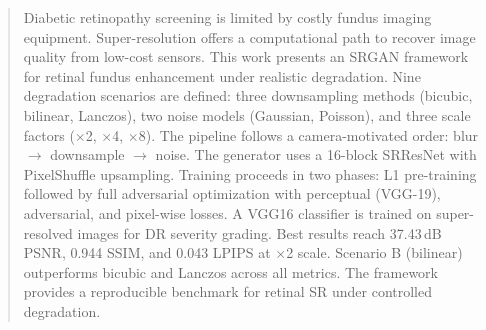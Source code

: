 \begin{abstract}

    Diabetic retinopathy screening is limited by costly fundus imaging equipment.
    Super-resolution offers a computational path to recover image quality from low-cost sensors.
    This work presents an SRGAN framework for retinal fundus enhancement under realistic degradation.
    Nine degradation scenarios are defined: three downsampling methods (bicubic, bilinear, Lanczos), two noise models (Gaussian, Poisson), and three scale factors ($\times$2, $\times$4, $\times$8).
    The pipeline follows a camera-motivated order: blur $\rightarrow$ downsample $\rightarrow$ noise.
    The generator uses a 16-block SRResNet with PixelShuffle upsampling.
    Training proceeds in two phases: L1 pre-training followed by full adversarial optimization with perceptual (VGG-19), adversarial, and pixel-wise losses.
    A VGG16 classifier is trained on super-resolved images for DR severity grading.
    Best results reach 37.43\,dB PSNR, 0.944 SSIM, and 0.043 LPIPS at $\times$2 scale.
    Scenario B (bilinear) outperforms bicubic and Lanczos across all metrics.
    The framework provides a reproducible benchmark for retinal SR under controlled degradation.

\end{abstract}
